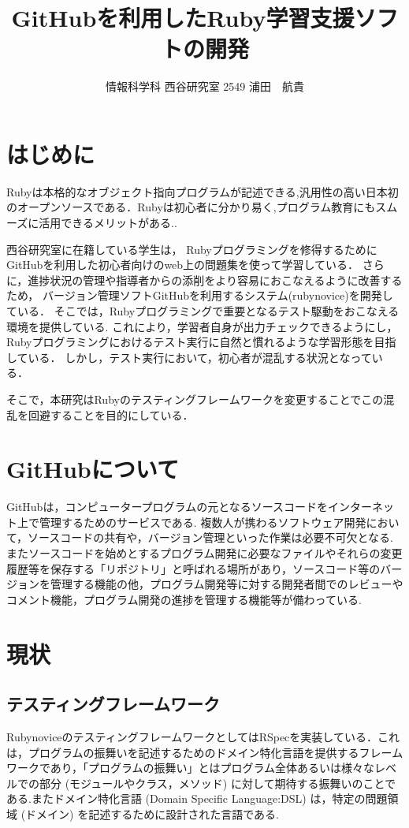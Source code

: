 \documentclass[a4j,twocolumn,uplatex]{jsarticle}
\begin{document}
\title{GitHubを利用したRuby学習支援ソフトの開発}
\author{情報科学科 西谷研究室 2549 浦田　航貴}
\date{}
\maketitle
\section{はじめに}
Rubyは本格的なオブジェクト指向プログラムが記述できる,汎用性の高い日本初のオープンソースである．Rubyは初心者に分かり易く,プログラム教育にもスムーズに活用できるメリットがある.\cite{1}.


西谷研究室に在籍している学生は，
Rubyプログラミングを修得するためにGitHubを利用した初心者向けのweb上の問題集を使って学習している．
さらに，進捗状況の管理や指導者からの添削をより容易におこなえるように改善するため，
バージョン管理ソフトGitHubを利用するシステム(rubynovice)を開発している．
そこでは，Rubyプログラミングで重要となるテスト駆動をおこなえる環境を提供している.
これにより，学習者自身が出力チェックできるようにし，
Rubyプログラミングにおけるテスト実行に自然と慣れるような学習形態を目指している．
しかし，テスト実行において，初心者が混乱する状況となっている．

そこで，本研究はRubyのテスティングフレームワークを変更することでこの混乱を回避することを目的にしている．

\section{GitHubについて}
GitHubは，コンピュータープログラムの元となるソースコードをインターネット上で管理するためのサービスである.
複数人が携わるソフトウェア開発において，ソースコードの共有や，バージョン管理といった作業は必要不可欠となる.
またソースコードを始めとするプログラム開発に必要なファイルやそれらの変更履歴等を保存する「リポジトリ」と呼ばれる場所があり，ソースコード等のバージョンを管理する機能の他，プログラム開発等に対する開発者間でのレビューやコメント機能，プログラム開発の進捗を管理する機能等が備わっている\cite{2}.

\section{現状}
\subsection{テスティングフレームワーク}
RubynoviceのテスティングフレームワークとしてはRSpecを実装している．これは，プログラムの振舞いを記述するためのドメイン特化言語を提供するフレームワークであり，「プログラムの振舞い」とはプログラム全体あるいは様々なレベルでの部分 (モジュールやクラス，メソッド) に対して期待する振舞いのことである.またドメイン特化言語 (Domain Specific Language:DSL) は，特定の問題領域 (ドメイン) を記述するために設計された言語である\cite{3}.
\end{document}
